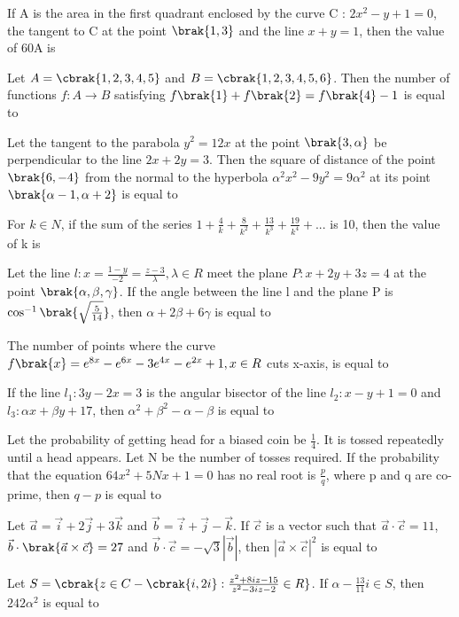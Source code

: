 \iffalse
\title{Assignment-5}
\author{EE24BTECH11048-NITHIN.K}
\section{integer}
\fi
\item If A is the area in the first quadrant enclosed by the curve C : $2x^2-y+1=0$, the tangent to C at the point $\brak{1,3}$ and the line $x+y=1$, then the value of 60A is

\item Let $A = \cbrak{1,2,3,4,5}$ and $B = \cbrak{1,2,3,4,5,6}$. Then the number of functions $f : A \rightarrow B$ satisfying $f\brak{1}+f\brak{2} = f\brak{4}-1$ is equal to

\item Let the tangent to the parabola $y^2 = 12x$ at the point $\brak{3,\alpha}$ be perpendicular to the line $2x+2y=3$. Then the square of distance of the point $\brak{6,-4}$ from the normal to the hyperbola $\alpha^2x^2 - 9y^2 = 9\alpha^2$ at its point $\brak{\alpha-1,\alpha+2}$ is equal to

\item For $k \in N$, if the sum of the series $1+\frac{4}{k}+\frac{8}{k^2}+\frac{13}{k^3}+\frac{19}{k^4}+ ...$ is 10, then the value of k is

\item Let the line $l : x = \frac{1-y}{-2} = \frac{z-3}{\lambda}, \lambda \in R$ meet the plane $P : x+2y+3z=4$ at the point $\brak{\alpha,\beta,\gamma}$. If the angle between the line l and the plane P is $\cos^{-1}\brak{\sqrt{\frac{5}{14}}}$, then $\alpha+2\beta+6\gamma$ is equal to

\item The number of points where the curve $f\brak{x}  = e^{8x}-e^{6x}-3e^{4x}-e^{2x}+1, x \in R$ cuts x-axis, is equal to

\item If the line $l_1 : 3y-2x=3$ is the angular bisector of the line $l_2 : x-y+1=0$ and $l_3 : \alpha x+\beta y+17$, then $\alpha^2+\beta^2-\alpha-\beta$ is equal to

\item Let the probability of getting head for a biased coin be $\frac{1}{4}$. It is tossed repeatedly until a head appears. Let N be the number of tosses required. If the probability that the equation $64x^2+5Nx+1=0$ has no real root is $\frac{p}{q}$, where p and q are co-prime, then $q-p$ is equal to

\item Let $\vec{a} = \vec{i}+2\vec{j}+3\vec{k}$ and $\vec{b} = \vec{i}+\vec{j}-\vec{k}$. If $\vec{c}$ is a vector such that $\vec{a}\cdot\vec{c}=11$, $\vec{b}\cdot\brak{\vec{a}\times\vec{c}}=27$ and $\vec{b}\cdot\vec{c}=-\sqrt{3}|\vec{b}|$, then $|\vec{a}\times\vec{c}|^2$ is equal to

\item Let $S = \cbrak{z \in C-\cbrak{i,2i}:\frac{z^2+8iz-15}{z^2-3iz-2} \in R}$. If $\alpha-\frac{13}{11}i \in S$, then $242\alpha^2$ is equal to
